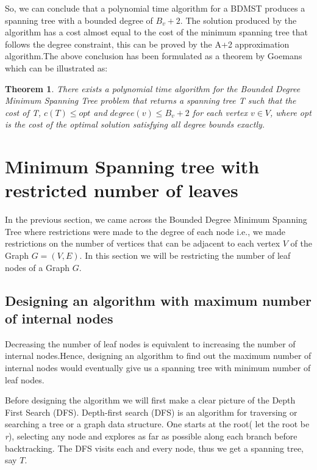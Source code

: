 \documentclass[12pt]{article}
\newtheorem{theorem}{Theorem}
\theoremstyle{plain}
\begin{document}
So, we can conclude that a polynomial time algorithm for a BDMST produces a spanning tree with a bounded degree of $B_v +2$. The solution produced by the algorithm has a cost almost equal to the cost of the minimum spanning tree that follows the degree constraint, this can be proved by the A+2 approximation algorithm.The above conclusion has been formulated as a theorem by Goemans which can be illustrated as: 

\begin{theorem}

There exists a polynomial time algorithm for the Bounded Degree Minimum  Spanning Tree problem that returns a spanning tree T such that  the cost of T, $c(T)  \leq  opt$ and $degree(v) \leq B_v + 2$ for each vertex $v \in V$, where opt is the cost of the optimal solution satisfying all degree bounds exactly.

\end{theorem}
\section*{Minimum Spanning tree with restricted number of leaves}

In the previous section, we came across the Bounded Degree Minimum Spanning Tree where restrictions were made to the degree of each node i.e., we made restrictions on the number of vertices that can be adjacent to each vertex $V$ of the Graph $G=(V,E)$. In this section we will be restricting the number of leaf nodes of a Graph $G$.

\subsection*{Designing an algorithm with maximum number of internal nodes }

Decreasing the number of leaf nodes is equivalent to increasing the number of internal nodes.Hence, designing an algorithm to find out the maximum number of internal nodes would eventually give us a spanning tree with minimum number of leaf nodes.

Before designing the algorithm we will first make a clear picture of the Depth First Search (DFS). Depth-first search (DFS) is an algorithm for traversing or searching a tree or a graph data structure. One starts at the root( let the root be \textit{r}), selecting any node and explores as far as possible along each branch before backtracking. The DFS visits each and every node, thus we get a spanning tree, say $T$.
\end{document}

